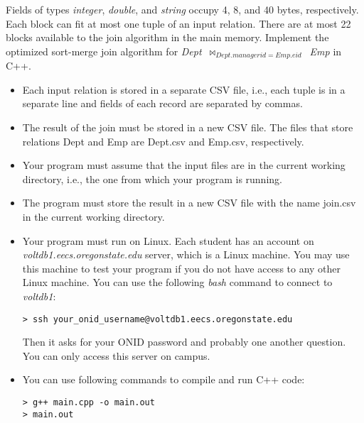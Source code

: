 \documentclass[11pt]{article}
\begin{document}
Fields of types \textit{integer}, \textit{double}, and \textit{string} occupy 4, 8, and 40 bytes, respectively.
Each block can fit at most one tuple of an input relation. There are at most 22 blocks available to the join algorithm in the main memory.
Implement the optimized sort-merge join algorithm for \textit{Dept}~$\bowtie_{Dept.managerid=Emp.eid}$~\textit{Emp} in C++.
\begin{itemize}
\item Each input relation is stored in a separate CSV file, i.e., each tuple is in a separate line and fields of each record are separated by commas.
\item The result of the join must be stored in a new CSV file.
The files that store relations Dept and Emp are Dept.csv and Emp.csv, respectively.
\item Your program must assume that the input files are in the current working directory, i.e., the one from which your program is running.
\item The program must store the result in a new CSV file with the name join.csv in the current working directory.
\item Your program must run on Linux. Each student has an account on
\textit{voltdb1.eecs.oregonstate.edu} server, which is a Linux machine. You may use this machine to test your program if you do not have access to any other Linux machine. You can use the following \textit{bash} command to connect to \textit{voltdb1}:
\begin{verbatim}
> ssh your_onid_username@voltdb1.eecs.oregonstate.edu
\end{verbatim}
Then it asks for your ONID password and probably one another question. You can only access this server on campus.

\item You can use following commands to compile and run C++ code:

\begin{verbatim}
> g++ main.cpp -o main.out
> main.out
\end{verbatim}

\end{itemize}
\end{document}
